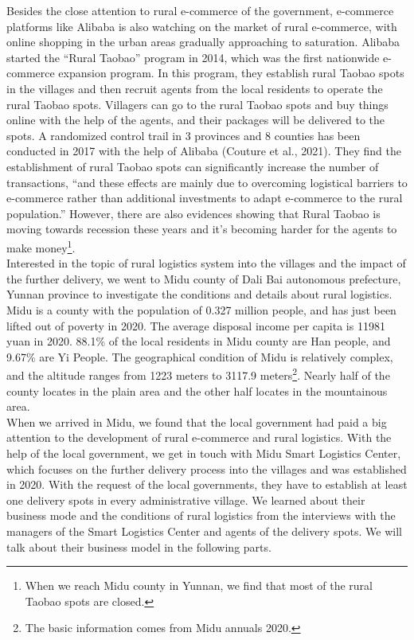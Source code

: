 \documentclass{article}
\begin{document}
Besides the close attention to rural e-commerce of the government, e-commerce platforms like Alibaba is also watching on the market of rural e-commerce, with online shopping in the urban areas  gradually approaching to saturation. Alibaba started the “Rural Taobao” program in 2014, which was the first nationwide e-commerce expansion program. In this program, they establish rural Taobao spots in the villages and then recruit agents from the local residents to operate the rural Taobao spots. Villagers can go to the rural Taobao spots and buy things online with the help of the agents, and their packages will be delivered to the spots. A randomized control trail in 3 provinces and 8 counties has been conducted in 2017 with the help of Alibaba (Couture et al., 2021). They find the establishment of rural Taobao spots can significantly increase the number of transactions, “and these effects are mainly due to overcoming logistical barriers to e-commerce rather than additional investments to adapt e-commerce to the rural population.” However, there are also evidences showing that Rural Taobao is moving towards recession these years and it’s becoming harder for the agents to make money\footnote{When we reach Midu county in Yunnan, we find that most of the rural Taobao spots are closed.}.\\
\mbox{\hspace{2em}}
Interested in the topic of rural logistics system into the villages and the impact of the further delivery, we went to Midu county of Dali Bai autonomous prefecture, Yunnan province to investigate the conditions and details about rural logistics. Midu is a county with the population of 0.327 million people, and has just been lifted out of poverty in 2020. The average disposal income per capita is 11981 yuan in 2020. 88.1\% of the local residents in Midu county are Han people, and 9.67\% are Yi People. The geographical condition of Midu is relatively complex, and the altitude ranges from 1223 meters to 3117.9 meters\footnote{The basic information comes from Midu annuals 2020.}. Nearly half of the county locates in the plain area and the other half locates in the mountainous area.\\
\mbox{\hspace{2em}}
When we arrived in Midu, we found that the local government had paid a big attention to the development of rural e-commerce and rural logistics. With the help of the local government, we get in touch with Midu Smart Logistics Center, which focuses on the further delivery process into the villages and was established in 2020. With the request of the local governments, they have to establish at least one delivery spots in every administrative village. We learned about their business mode and the conditions of rural logistics from the interviews with the managers of the Smart Logistics Center and agents of the delivery spots. We will talk about their business model in the following parts.\\
\end{document}
